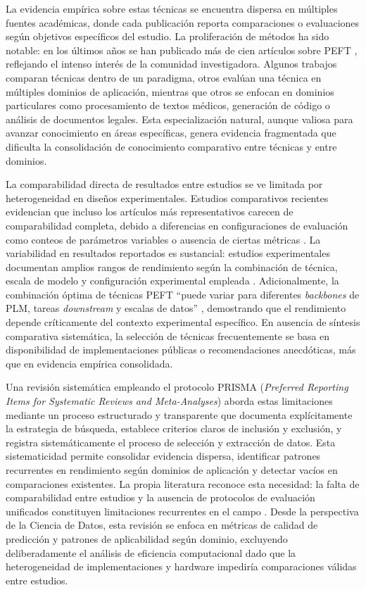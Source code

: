La evidencia empírica sobre estas técnicas se encuentra dispersa en múltiples fuentes académicas, donde cada publicación reporta comparaciones o evaluaciones según objetivos específicos del estudio. La proliferación de métodos ha sido notable: en los últimos años se han publicado más de cien artículos sobre PEFT \parencite[p.~2]{Lialin2024}, reflejando el intenso interés de la comunidad investigadora. Algunos trabajos comparan técnicas dentro de un paradigma, otros evalúan una técnica en múltiples dominios de aplicación, mientras que otros se enfocan en dominios particulares como procesamiento de textos médicos, generación de código o análisis de documentos legales. Esta especialización natural, aunque valiosa para avanzar conocimiento en áreas específicas, genera evidencia fragmentada que dificulta la consolidación de conocimiento comparativo entre técnicas y entre dominios.

La comparabilidad directa de resultados entre estudios se ve limitada por heterogeneidad en diseños experimentales. Estudios comparativos recientes evidencian que incluso los artículos más representativos carecen de comparabilidad completa, debido a diferencias en configuraciones de evaluación como conteos de parámetros variables o ausencia de ciertas métricas \parencite[p.~35]{Lialin2024}. La variabilidad en resultados reportados es sustancial: estudios experimentales documentan amplios rangos de rendimiento según la combinación de técnica, escala de modelo y configuración experimental empleada \parencite[p.~29, Tabla~4]{Lialin2024}. Adicionalmente, la combinación óptima de técnicas PEFT ``puede variar para diferentes \textit{backbones} de PLM, tareas \textit{downstream} y escalas de datos'' \parencite[p.~221]{Ding2023}, demostrando que el rendimiento depende críticamente del contexto experimental específico. En ausencia de síntesis comparativa sistemática, la selección de técnicas frecuentemente se basa en disponibilidad de implementaciones públicas o recomendaciones anecdóticas, más que en evidencia empírica consolidada.

Una revisión sistemática empleando el protocolo PRISMA (\textit{Preferred Reporting Items for Systematic Reviews and Meta-Analyses}) aborda estas limitaciones mediante un proceso estructurado y transparente que documenta explícitamente la estrategia de búsqueda, establece criterios claros de inclusión y exclusión, y registra sistemáticamente el proceso de selección y extracción de datos. Esta sistematicidad permite consolidar evidencia dispersa, identificar patrones recurrentes en rendimiento según dominios de aplicación y detectar vacíos en comparaciones existentes. La propia literatura reconoce esta necesidad: la falta de comparabilidad entre estudios y la ausencia de protocolos de evaluación unificados constituyen limitaciones recurrentes en el campo \parencite[p.~35]{Lialin2024}. Desde la perspectiva de la Ciencia de Datos, esta revisión se enfoca en métricas de calidad de predicción y patrones de aplicabilidad según dominio, excluyendo deliberadamente el análisis de eficiencia computacional dado que la heterogeneidad de implementaciones y hardware impediría comparaciones válidas entre estudios.

